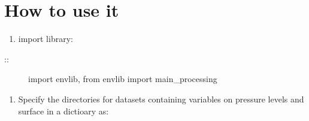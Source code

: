 \documentclass[a4paper,11pt,english]{sphinxmanual}
\begin{document}
\chapter{How to use it}
\label{\detokenize{index:how-to-use-it}}\begin{enumerate}
%
\item {} 
import library:

\end{enumerate}
\begin{description}
\item[{::}] \leavevmode
import envlib,
from envlib import main\_processing

\end{description}
\begin{enumerate}
%
\setcounter{enumi}{1}
\item {} 
Specify the directories for datasets containing variables on pressure levels and surface in a dictioary as:

\end{enumerate}
\end{document}
